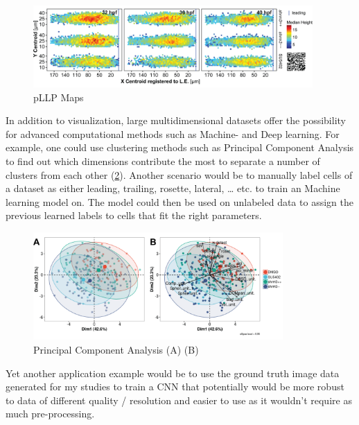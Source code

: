 \documentclass[11pt,singlespacinge,twoside]{reedthesis} %
\begin{document}
\begin{figure}

{\centering \includegraphics[width=0.95\textwidth]{figures/summary/methodology_mapr} 

}

\caption[pLLP Maps]{pLLP Maps}\label{fig:dismap}
\end{figure}
In addition to visualization, large multidimensional datasets offer the possibility for advanced computational methods such as Machine- and Deep learning. For example, one could use clustering methods such as Principal Component Analysis to find out which dimensions contribute the most to separate a number of clusters from each other (\ref{fig:dispca}). Another scenario would be to manually label cells of a dataset as either leading, trailing, rosette, lateral, \ldots{} etc. to train an Machine learning model on. The model could then be used on unlabeled data to assign the previous learned labels to cells that fit the right parameters.


\begin{figure}

{\centering \includegraphics[width=0.85\textwidth]{figures/summary/pca_fig} 

}

\caption[Principal Component Analysis]{Principal Component Analysis (A) (B)}\label{fig:dispca}
\end{figure}
Yet another application example would be to use the ground truth image data generated for my studies to train a CNN that potentially would be more robust to data of different quality / resolution and easier to use as it wouldn't require as much pre-processing.
\end{document}

